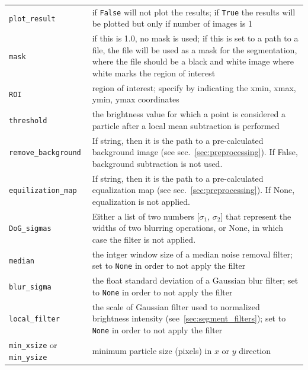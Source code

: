 \documentclass[10pt,a4paper]{article}
\begin{document}
\begin{table}[!ht]
\begin{tabular}{l m{13cm}}
		\texttt{plot\_result} & if \texttt{False} will not plot the results; if \texttt{True} the results will be plotted but only if number of images is 1 \\[.3em]
		
		\texttt{mask} & if this is 1.0, no mask is used; if this is set to a path to a file, the file will be used as a mask for the segmentation, where the file should be a black and white image where white marks the region of interest \\[.3em]
		
		\texttt{ROI} & region of interest; specify by indicating the xmin, xmax, ymin, ymax coordinates \\[.3em]
		
		\texttt{threshold} & the brightness value for which a point is considered a particle after a local mean subtraction is performed \\[.5em]
		
		\texttt{remove\_background} & If string, then it is the path to a pre-calculated background image (see sec.~\ref{sec:preprocessing}). If False, background subtraction is not used.\\[.5em]
		
		\texttt{equilization\_map} & If string, then it is the path to a pre-calculated equalization map (see sec.~\ref{sec:preprocessing}). If None, equalization is not applied.\\[.5em]
		
		\texttt{DoG\_sigmas} & Either a list of two numbers [$\sigma_1$, $\sigma_2$] that represent the widths of two blurring operations, or None, in which case the filter is not applied.\\[.5em]
		
		\texttt{median} & the intger window size of a median noise removal filter; set to \texttt{None} in order to not apply the filter \\[.3em]
		
		\texttt{blur\_sigma} & the float standard deviation of a Gaussian blur filter; set to \texttt{None} in order to not apply the filter \\[.3em]
		
		\texttt{local\_filter} & the scale of Gaussian filter used to normalized brightness intensity (see~\ref{sec:segment_filters}); set to \texttt{None} in order to not apply the filter \\[.3em]
		
		\texttt{min\_xsize} or \texttt{min\_ysize} & minimum particle size (pixels) in $x$ or $y$ direction \\[.3em]
		

\end{tabular}
\end{table}
\end{document}
